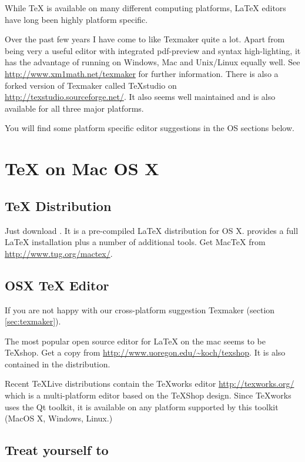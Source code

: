 While \TeX{} is available on many different computing platforms, \LaTeX{}
editors have long been highly platform specific.

Over the past few years I have come to like Texmaker quite a lot.
Apart from being very a useful editor with integrated pdf-preview and syntax
high-lighting, it has the advantage of running on Windows, Mac and
Unix/Linux equally well.  See \url{http://www.xm1math.net/texmaker} for
further information.  There is also a forked version of Texmaker called
TeXstudio on \url{http://texstudio.sourceforge.net/}.  It also seems well
maintained and is also available for all three major platforms.

You will find some platform specific editor suggestions in the OS sections
below.

\section{\TeX{} on Mac OS X}

\subsection{\TeX{} Distribution}

Just download . It is a
pre-compiled \LaTeX{} distribution for OS X.  provides a full \LaTeX{}
installation plus a number of additional tools. Get Mac\TeX{} from
\url{http://www.tug.org/mactex/}.

\subsection{OSX \TeX{} Editor}

If you are not happy with our cross-platform suggestion Texmaker (section \ref{sec:texmaker}).
 
The most popular open source editor for \LaTeX{} on the mac seems to be
\TeX{}shop.  Get a copy from \url{http://www.uoregon.edu/~koch/texshop}. It
is also contained in the  distribution.

Recent \TeX Live distributions contain the \TeX{}works editor 
\url{http://texworks.org/} which is a multi-platform editor based on the \TeX{}Shop
design. Since \TeX{}works uses the Qt toolkit, it is available on any platform
supported by this toolkit (MacOS X, Windows, Linux.) 

\subsection{Treat yourself to }


